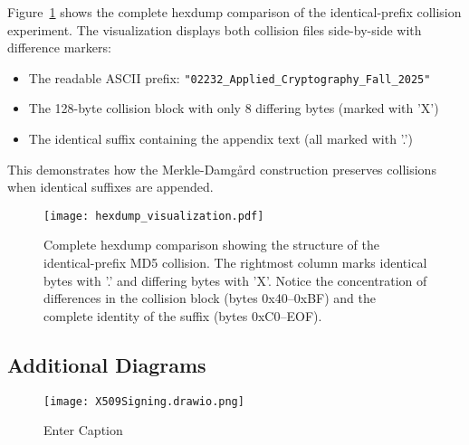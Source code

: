 \documentclass[runningheads]{llncs}
\begin{document}
    Figure~\ref{fig:hexdump-full} shows the complete hexdump comparison of the identical-prefix collision experiment. The visualization displays both collision files side-by-side with difference markers:
    \begin{itemize}
        \item The readable ASCII prefix: \texttt{"02232\_Applied\_Cryptography\_Fall\_2025"}
        \item The 128-byte collision block with only 8 differing bytes (marked with 'X')
        \item The identical suffix containing the appendix text (all marked with '.')
    \end{itemize}

    This demonstrates how the Merkle-Damgård construction preserves collisions when identical suffixes are appended.

    \begin{figure}[p]
        \centering
        \texttt{[image: hexdump\_visualization.pdf]}
        \caption{Complete hexdump comparison showing the structure of the identical-prefix MD5 collision. The rightmost column marks identical bytes with '.' and differing bytes with 'X'. Notice the concentration of differences in the collision block (bytes 0x40--0xBF) and the complete identity of the suffix (bytes 0xC0--EOF).}
        \label{fig:hexdump-full}
    \end{figure}

    \clearpage

    \subsection{Additional Diagrams}

    \begin{figure}
        \centering
        \texttt{[image: X509Signing.drawio.png]}
        \caption{Enter Caption}
        \label{fig:x509-signing}
    \end{figure}
\end{document}
